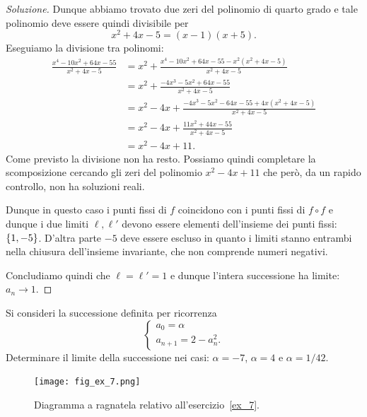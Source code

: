 \begin{proof}[Soluzione]
Dunque abbiamo trovato due zeri del polinomio di quarto grado e
tale polinomio deve essere quindi divisibile per
\[
 x^2 + 4x - 5 = (x-1)(x+5).
\]
Eseguiamo la divisione tra polinomi:
\begin{align*}
\frac{x^4 - 10 x^2 + 64 x - 55}{x^2 + 4x - 5}
&= x^2 + \frac{x^4 - 10 x^2 + 64x - 55 - x^2 (x^2 + 4x - 5)}{x^2+4x-5}\\
&= x^2 + \frac{-4x^3 - 5 x^2 + 64 x - 55}{x^2+4x-5}\\
&= x^2 - 4x + \frac{-4x^3 - 5x^2 - 64 x - 55 + 4x(x^2+4x-5)}{x^2+4x-5}
\\
&= x^2 - 4x + \frac{11 x^2 + 44 x - 55}{x^2 + 4x -5}\\
&= x^2 - 4x + 11.
\end{align*}
Come previsto la divisione non ha resto. Possiamo quindi completare la
scomposizione cercando gli zeri del polinomio $x^2-4x+11$ che però, da
un rapido controllo, non ha soluzioni reali.

Dunque in questo caso i punti fissi di $f$ coincidono con i punti
fissi di $f\circ f$ e dunque i due limiti $\ell, \ell'$ devono essere
elementi dell'insieme dei punti fissi: ${\left\{ 1, -5 \right\}}$. D'altra parte $-5$
deve essere escluso in quanto i limiti stanno entrambi nella chiusura
dell'insieme invariante, che non comprende numeri negativi.

Concludiamo quindi che $\ell = \ell' = 1$ e dunque l'intera
successione ha limite: $a_n \to 1$.
\end{proof}

\begin{exercise}\label{ex_7}
  Si consideri la successione definita per ricorrenza
  \[
  \begin{cases}
    a_0 = \alpha\\
    a_{n+1} = 2- a_n^2.
  \end{cases}
  \]
  Determinare il limite della successione nei casi: $\alpha=-7$, $\alpha=4$ e $\alpha=1/42$.
\end{exercise}

\begin{figure}
   \begin{center}
    \texttt{[image: fig\_ex\_7.png]}
  \end{center}
  \caption{Diagramma a ragnatela relativo
    all'esercizio~\ref{ex_7}.}
  \label{fig_ex_7}
\end{figure}

